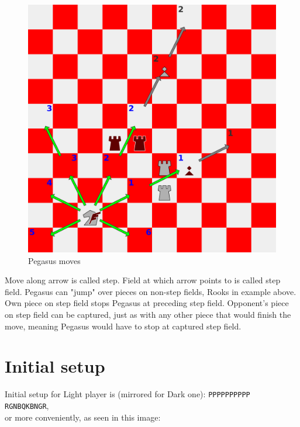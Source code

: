 \documentclass[a5paper,12pt,draft]{book} %
\begin{document}
\noindent
\begin{figure}[!t]
\includegraphics[width=1.0\textwidth, keepaspectratio=true]{../gfx/examples/03_move_pegasus.png}
\caption{Pegasus moves}
\label{fig:pegasus_moves}
\end{figure}
\indent
Move along arrow is called step. Field at which arrow points to is called step field.
Pegasus can "jump" over pieces on non-step fields, Rooks in example above. Own piece
on step field stops Pegasus at preceding step field. Opponent's piece on step field
can be captured, just as with any other piece that would finish the move, meaning
Pegasus would have to stop at captured step field.

\clearpage

\section*{Initial setup}

Initial setup for Light player is (mirrored for Dark one):
\texttt{PPPPPPPPPP \\
        RGNBQKBNGR}, \\
or more conveniently, as seen in this image:
\end{document}
